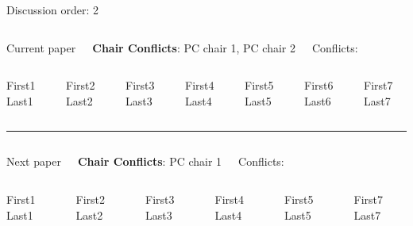 \documentclass[9pt,t,serif]{beamer}
\begin{document}
\begin{frame}[t]{Discussion order: 2}
\begin{columns}[t]
Current paper 

\textbf{Chair Conflicts}: PC chair 1, PC chair 2

Conflicts:

\vspace{10pt}

\end{columns}
\begin{columns}[t]
First1 Last1

First2 Last2

First3 Last3

First4 Last4

First5 Last5

First6 Last6

First7 Last7

\end{columns}
\vspace{10pt}
\hrule
\vspace{10pt}
\begin{columns}[t]


 Next paper

\textbf{Chair Conflicts}: PC chair 1

Conflicts:

\vspace{10pt}

\end{columns}
\begin{columns}[t]
First1 Last1

First2 Last2

First3 Last3

First4 Last4

First5 Last5

First7 Last7

\end{columns}
\end{frame}
\end{document}

